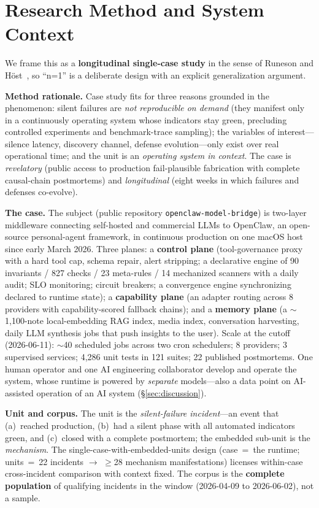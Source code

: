 \documentclass[conference]{IEEEtran}
\begin{document}
\section{Research Method and System Context}\label{sec:method}
We frame this as a \textbf{longitudinal single-case study} in the sense of
Runeson and H\"ost~\cite{runeson2009case}, so ``n=1'' is a deliberate
design with an explicit generalization argument.

\textbf{Method rationale.} Case study fits for three reasons grounded in
the phenomenon: silent failures are \emph{not reproducible on demand}
(they manifest only in a continuously operating system whose indicators
stay green, precluding controlled experiments and benchmark-trace
sampling); the variables of interest---silence latency, discovery channel,
defense evolution---only exist over real operational time; and the unit is
an \emph{operating system in context}. The case is \emph{revelatory}
(public access to production fail-plausible fabrication with complete
causal-chain postmortems) and \emph{longitudinal} (eight weeks in which
failures and defenses co-evolve).

\textbf{The case.} The subject (public repository
\texttt{openclaw-model-bridge}) is two-layer middleware connecting
self-hosted and commercial LLMs to OpenClaw, an open-source personal-agent
framework, in continuous production on one macOS host since early March
2026. Three planes: a \textbf{control plane} (tool-governance proxy with a
hard tool cap, schema repair, alert stripping; a declarative engine of 90
invariants / 827 checks / 23 meta-rules / 14 mechanized scanners with a
daily audit; SLO monitoring; circuit breakers; a convergence engine
synchronizing declared to runtime state); a \textbf{capability plane} (an
adapter routing across 8 providers with capability-scored fallback
chains); and a \textbf{memory plane} (a $\sim$1{,}100-note local-embedding
RAG index, media index, conversation harvesting, daily LLM synthesis jobs
that push insights to the user). Scale at the cutoff (2026-06-11):
$\sim$40 scheduled jobs across two cron schedulers; 8 providers; 3
supervised services; 4{,}286 unit tests in 121 suites; 22 published
postmortems. One human operator and one AI engineering collaborator
develop and operate the system, whose runtime is powered by \emph{separate}
models---also a data point on AI-assisted operation of an AI system
(\S\ref{sec:discussion}).

\textbf{Unit and corpus.} The unit is the \emph{silent-failure
incident}---an event that (a)~reached production, (b)~had a silent phase
with all automated indicators green, and (c)~closed with a complete
postmortem; the embedded sub-unit is the \emph{mechanism}. The
single-case-with-embedded-units design (case~=~the runtime; units~=~22
incidents $\to$ $\geq$28 mechanism manifestations) licenses within-case
cross-incident comparison with context fixed. The corpus is the
\textbf{complete population} of qualifying incidents in the window
(2026-04-09 to 2026-06-02), not a sample.
\end{document}
